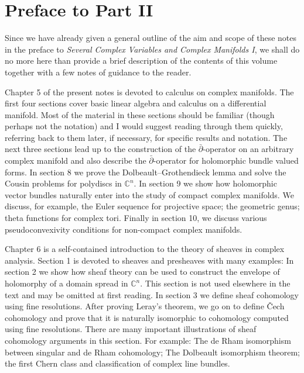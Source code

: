 \chapter*{Preface to Part II}
Since we have already given a general outline of the aim and scope of these notes in the preface to \emph{Several Complex Variables and Complex Manifolds I}, we shall do no more here than provide a brief description of the contents of this volume together with a few notes of guidance to the reader.

Chapter 5 of the present notes is devoted to calculus on complex manifolds. The first four sections cover basic linear algebra and calculus on a differential manifold. Most of the material in these sections should be familiar (though perhaps not the notation) and I would suggest reading through them quickly, referring back to them later, if necessary, for specific results and notation. The next three sections lead up to the construction of the $\bar\partial$-operator on an arbitrary complex manifold and also describe the $\bar\partial$-operator for holomorphic bundle valued forms. In section 8 we prove the Dolbeault--Grothendieck lemma and solve the Cousin problems for polydiscs in $\mathbb{C}^n$. In section 9 we show how holomorphic vector bundles naturally enter into the study of compact complex manifolds. We discuss, for example, the Euler sequence for projective space; the geometric genus; theta functions for complex tori. Finally in section 10, we discuss various pseudoconvexivity conditions for non-compact complex manifolds.

Chapter 6 is a self-contained introduction to the theory of sheaves in complex analysis. Section 1 is devoted to sheaves and presheaves with many examples: In section 2 we show how sheaf theory can be used to construct the envelope of holomorphy of a domain spread in $\mathbb{C}^n$. This section is not used elsewhere in the text and may be omitted at first reading. In section 3 we define sheaf cohomology using fine resolutions. After proving Leray's theorem, we go on to define \v{C}ech cohomology and prove that it is naturally isomorphic to cohomology computed using fine resolutions. There are many important illustrations of sheaf cohomology arguments in this section. For example: The de Rham isomorphism between singular and de Rham cohomology; The Dolbeault isomorphism theorem; the first Chern class and classification of complex line bundles.


